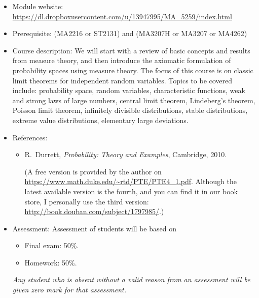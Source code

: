 \documentclass[a4paper]{article}
\begin{document}
\begin{itemize}
\item Module website: \url{https://dl.dropboxusercontent.com/u/13947995/MA_5259/index.html}
  
\item Prerequisite: (MA2216 or ST2131) and (MA3207H or MA3207 or MA4262)
  
\item Course description: We will start with a review of basic concepts and results from measure theory, and then introduce the axiomatic formulation of probability spaces using measure theory. The focus of this course is on classic limit theorems for independent random variables. Topics to be covered include: probability space, random variables, characteristic functions, weak and strong laws of large numbers, central limit theorem, Lindeberg's theorem, Poisson limit theorem, infinitely divisible distributions, stable distributions, extreme value distributions, elementary large deviations. 
  
\item References:
  \begin{itemize}
  \item
    R.~Durrett, \emph{Probability: Theory and Examples}, Cambridge, 2010.
    
    (A free version is provided by the author on \url{https://www.math.duke.edu/~rtd/PTE/PTE4_1.pdf}. Although the latest available version is the fourth, and you can find it in our book store, I personally use the third version: \url{http://book.douban.com/subject/1797985/}.)
  \end{itemize}
\item Assessment:
  Assessment of students will be based on
  \begin{itemize}
  \item Final exam: 50\%.
  \item Homework: 50\%.
  \end{itemize}
  \emph{Any student who is absent without a valid reason from an assessment will be given zero mark for that assessment.}
\end{itemize}
\end{document}
